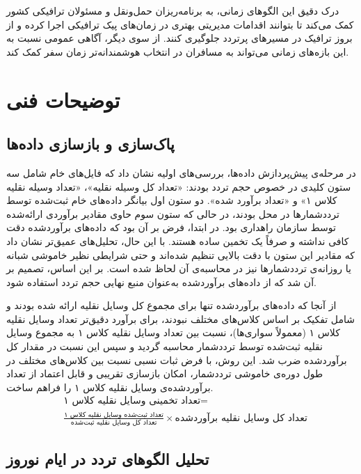 \documentclass[a4paper, 12pt]{article}
\begin{document}
درک دقیق این الگوهای زمانی، به برنامه‌ریزان حمل‌ونقل و مسئولان ترافیکی کشور کمک می‌کند تا بتوانند اقدامات مدیریتی بهتری در زمان‌های پیک ترافیکی اجرا کرده و از بروز ترافیک در مسیرهای پرتردد جلوگیری کنند. از سوی دیگر، آگاهی عمومی نسبت به این بازه‌های زمانی می‌تواند به مسافران در انتخاب هوشمندانه‌تر زمان سفر کمک کند.

\newpage
\section{توضیحات فنی}

\subsection{پاک‌سازی و بازسازی داده‌ها}

در مرحله‌ی پیش‌پردازش داده‌ها، بررسی‌های اولیه نشان داد که فایل‌های خام شامل سه ستون کلیدی در خصوص حجم تردد بودند: «تعداد کل وسیله نقلیه»، «تعداد وسیله نقلیه کلاس ۱» و «تعداد برآورد شده». دو ستون اول بیانگر داده‌های خام ثبت‌شده توسط ترددشمارها در محل بودند، در حالی که ستون سوم حاوی مقادیر برآوردی ارائه‌شده توسط سازمان راهداری بود. در ابتدا، فرض بر آن بود که داده‌های برآوردشده دقت کافی نداشته و صرفاً یک تخمین ساده هستند. با این حال، تحلیل‌های عمیق‌تر نشان داد که مقادیر این ستون با دقت بالایی تنظیم شده‌اند و حتی شرایطی نظیر خاموشی شبانه یا روزانه‌ی ترددشمارها نیز در محاسبه‌ی آن لحاظ شده است. بر این اساس، تصمیم بر آن شد که از داده‌های برآوردشده به‌عنوان منبع نهایی حجم تردد استفاده شود.

\medskip
از آنجا که داده‌های برآوردشده تنها برای مجموع کل وسایل نقلیه ارائه شده بودند و شامل تفکیک بر اساس کلاس‌های مختلف نبودند، برای برآورد دقیق‌تر تعداد وسایل نقلیه کلاس ۱ (معمولاً سواری‌ها)، نسبت بین تعداد وسایل نقلیه کلاس ۱ به مجموع وسایل نقلیه ثبت‌شده توسط ترددشمار محاسبه گردید و سپس این نسبت در مقدار کل برآوردشده ضرب شد. این روش، با فرض ثبات نسبی نسبت بین کلاس‌های مختلف در طول دوره‌ی خاموشی ترددشمار، امکان بازسازی تقریبی و قابل اعتماد از تعداد برآوردشده‌ی وسایل نقلیه کلاس ۱ را فراهم ساخت. 
\[
\begin{aligned}
    & \text{تعداد تخمینی وسایل نقلیه کلاس ۱} = \\
& \frac{\text{تعداد ثبت‌شده وسایل نقلیه کلاس ۱}}{\text{تعداد کل وسایل نقلیه ثبت‌شده}} \times 
\text{تعداد کل وسایل نقلیه برآوردشده}
\end{aligned}
\]
\subsection{تحلیل الگوهای تردد در ایام نوروز}
\end{document}
